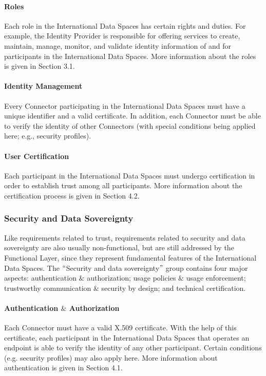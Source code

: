 \paragraph{Roles\\}
Each role in the International Data Spaces has certain rights and duties. For example, the Identity Provider is responsible for offering services to create, maintain, manage, monitor, and validate identity information of and for participants in the International Data Spaces. More information about the roles is given in Section 3.1. %


\paragraph{Identity Management\\}
Every Connector participating in the International Data Spaces must have a unique identifier and a valid certificate. In addition, each Connector must be able to verify the identity of other Connectors (with special conditions being applied here; e.g., security profiles). 

\paragraph{User Certification\\}
Each participant in the International Data Spaces must undergo certification in order to establish trust among all participants. More information about the certification process is given in Section 4.2. %


\subsubsection{Security and Data Sovereignty}
Like requirements related to trust, requirements related to security and data sovereignty are also usually non-functional, but are still addressed by the Functional Layer, since they represent fundamental features of the International Data Spaces. The $``$Security and data sovereignty$"$  group contains four major aspects: authentication $\&$  authorization; usage policies $\&$  usage enforcement; trustworthy communication $\&$  security by design; and technical certification.


\paragraph{Authentication $\&$  Authorization\\}
Each Connector must have a valid X.509 certificate. With the help of this certificate, each participant in the International Data Spaces that operates an endpoint is able to verify the identity of any other participant. Certain conditions (e.g. security profiles) may also apply here. More information about authentication is given in Section 4.1. %

